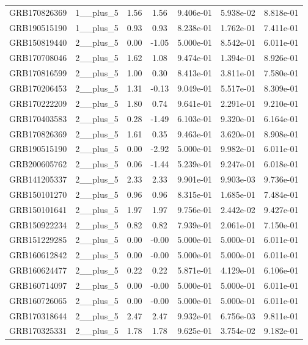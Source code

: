 \documentclass[12pt]{article}
\begin{document}
\begin{table}[h!]
{\begin{tabular}{l c c c c c c}
GRB170826369 & 1__plus_5 & 1.56 & 1.56 & 9.406e-01 & 5.938e-02 & 8.818e-01 \\
GRB190515190 & 1__plus_5 & 0.93 & 0.93 & 8.238e-01 & 1.762e-01 & 7.411e-01 \\
GRB150819440 & 2__plus_5 & 0.00 & -1.05 & 5.000e-01 & 8.542e-01 & 6.011e-01 \\
GRB170708046 & 2__plus_5 & 1.62 & 1.08 & 9.474e-01 & 1.394e-01 & 8.926e-01 \\
GRB170816599 & 2__plus_5 & 1.00 & 0.30 & 8.413e-01 & 3.811e-01 & 7.580e-01 \\
GRB170206453 & 2__plus_5 & 1.31 & -0.13 & 9.049e-01 & 5.517e-01 & 8.309e-01 \\
GRB170222209 & 2__plus_5 & 1.80 & 0.74 & 9.641e-01 & 2.291e-01 & 9.210e-01 \\
GRB170403583 & 2__plus_5 & 0.28 & -1.49 & 6.103e-01 & 9.320e-01 & 6.164e-01 \\
GRB170826369 & 2__plus_5 & 1.61 & 0.35 & 9.463e-01 & 3.620e-01 & 8.908e-01 \\
GRB190515190 & 2__plus_5 & 0.00 & -2.92 & 5.000e-01 & 9.982e-01 & 6.011e-01 \\
GRB200605762 & 2__plus_5 & 0.06 & -1.44 & 5.239e-01 & 9.247e-01 & 6.018e-01 \\
GRB141205337 & 2__plus_5 & 2.33 & 2.33 & 9.901e-01 & 9.903e-03 & 9.736e-01 \\
GRB150101270 & 2__plus_5 & 0.96 & 0.96 & 8.315e-01 & 1.685e-01 & 7.484e-01 \\
GRB150101641 & 2__plus_5 & 1.97 & 1.97 & 9.756e-01 & 2.442e-02 & 9.427e-01 \\
GRB150922234 & 2__plus_5 & 0.82 & 0.82 & 7.939e-01 & 2.061e-01 & 7.150e-01 \\
GRB151229285 & 2__plus_5 & 0.00 & -0.00 & 5.000e-01 & 5.000e-01 & 6.011e-01 \\
GRB160612842 & 2__plus_5 & 0.00 & -0.00 & 5.000e-01 & 5.000e-01 & 6.011e-01 \\
GRB160624477 & 2__plus_5 & 0.22 & 0.22 & 5.871e-01 & 4.129e-01 & 6.106e-01 \\
GRB160714097 & 2__plus_5 & 0.00 & -0.00 & 5.000e-01 & 5.000e-01 & 6.011e-01 \\
GRB160726065 & 2__plus_5 & 0.00 & -0.00 & 5.000e-01 & 5.000e-01 & 6.011e-01 \\
GRB170318644 & 2__plus_5 & 2.47 & 2.47 & 9.932e-01 & 6.756e-03 & 9.811e-01 \\
GRB170325331 & 2__plus_5 & 1.78 & 1.78 & 9.625e-01 & 3.754e-02 & 9.182e-01 \\

\end{tabular}}
\end{table}
\end{document}

